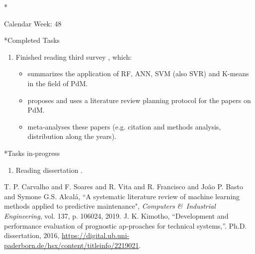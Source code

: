 \documentclass[11pt,a4paper]{article}
\begin{document}
\newpage
\begin{section}*{Calendar Week: 48 \hfill \date{27 November, 2020}}
	
	\begin{subsection}*{Completed Tasks}
		\begin{enumerate}
			\item Finished reading third survey \cite{survey3}, which:
			\begin{itemize}
				\item summarizes the application of RF, ANN, SVM (also SVR) and K-means in the field of PdM.
				\item proposes and uses a literature review planning protocol for the papers on PdM.
				\item meta-analyses these papers (e.g. citation and methods analysis, distribution along the years).
			\end{itemize}
		\end{enumerate}
	\end{subsection}
	
	\begin{subsection}*{Tasks in-progress}
		\begin{enumerate}
			\item
			Reading dissertation \cite{survey4}.
		\end{enumerate}
	\end{subsection}
	
	\begin{thebibliography}{9}
		{T. P. Carvalho and F. Soares and R. Vita and R. Francisco and Jo{\~a}o P. Basto and Symone G.S. Alcal{\'a}},
		“A systematic literature review of machine learning methods applied to predictive maintenance",
		\textit{Computers \&\ Industrial Engineering},
		vol. 137,
		p. 106024,
		2019.
		{J. K. Kimotho}, 
		“Development and performance evaluation of prognostic ap-proaches  for  technical  systems,”.
		Ph.D.  dissertation,  
		2016,  
		\href{https://digital.ub.uni-paderborn.de/hsx/content/titleinfo/2219021}{https://digital.ub.uni-paderborn.de/hsx/content/titleinfo/2219021}.
	\end{thebibliography}
\end{section}
\newpage
\end{document}
